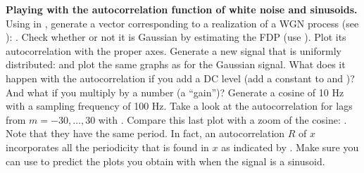 \bApplication \textbf{Playing with the autocorrelation function of white noise and sinusoids.}
\label{app:autocorrelationWhiteSines}
Using  in {\matlab}, generate a vector corresponding to a realization of a WGN process (see ): . Check whether or not it is
Gaussian by estimating the FDP (use ). Plot its
autocorrelation with the proper axes. Generate a new signal that is uniformly distributed:  and
plot the same graphs as for the Gaussian signal. What does it
happen with the autocorrelation if you add a DC level (add a
constant to  and )? And what if you multiply by a number (a
``gain'')? Generate a cosine  of 10 Hz with a sampling frequency of 100 Hz.
Take a look at the autocorrelation for lags from $m=-30,\ldots,30$ with
. Compare this last
plot with a zoom of the cosine: . Note that they
have the same period. In fact, an autocorrelation $R$ of $x$
incorporates all the periodicity that is found in $x$ as indicated by .
Make sure you can use  to predict the plots you obtain with  when the signal is a sinusoid.
\eApplication

